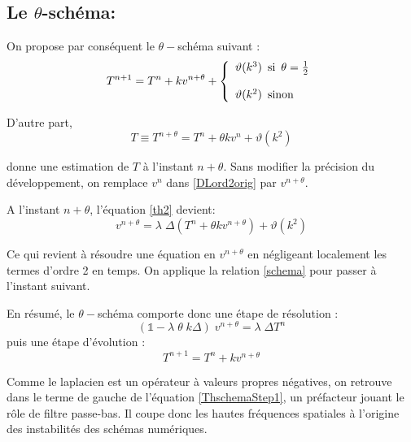 \documentclass[a4paper, 12pt]{article}
\begin{document}
\subsection{Le $\theta$-schéma:}

\noindent On propose par conséquent le $\theta-$schéma suivant :
 \begin{eqnarray}
 T^{n+1} = T^n+ k   v^{n+\theta} +
 \left\{ 
\begin{array}{l l l}
  \vartheta(k^3) \text{\, si \,} \theta=\frac{1}{2} \\
   \\
\vartheta(k^2) \text{\, sinon} \end{array} \right. 
  \label{schema}
  \end{eqnarray}
  
\noindent D'autre part, 
\begin{equation}
T \equiv T^{n + \theta}= T^n+ \theta k v^n + \vartheta(k^2)
 \label{DLord2orig}
\end{equation}

donne une estimation de $T$ à l'instant $n+\theta$. Sans modifier la précision
du développement,
on remplace $v^n$ dans \eqref{DLord2orig} par $v^{n+\theta}$. 

A l'instant $n+\theta$, l'équation \eqref{th2} devient:
\begin{equation}
v^{n + \theta}= \lambda\; \Delta (T^n+ \theta k v^{n + \theta}) + \vartheta(k^2)
 \label{DLord2inter}
\end{equation}

Ce qui revient à résoudre une équation en  $v^{n + \theta}$ en négligeant localement
les termes d'ordre 2 en temps. On applique la relation \eqref{schema} pour passer à 
l'instant suivant.

En résumé, le $\theta-$schéma comporte donc une étape de résolution :
\begin{equation}
 ( \mathds{1} -\lambda\; \theta\; k \Delta)\; v^{n + \theta} = \lambda\; \Delta T^n 
 \label{ThschemaStep1}
\end{equation}
puis une étape d'évolution :
\begin{equation}
T^{n+1} = T^n+ k   v^{n+\theta}
\label{ThschemaStep2}
\end{equation}

Comme le laplacien est un opérateur à valeurs propres négatives, on retrouve dans le terme
de gauche de l'équation \eqref{ThschemaStep1}, un préfacteur jouant le rôle de filtre passe-bas. Il coupe donc les hautes
fréquences spatiales à l'origine des instabilités des schémas numériques.
\end{document}
